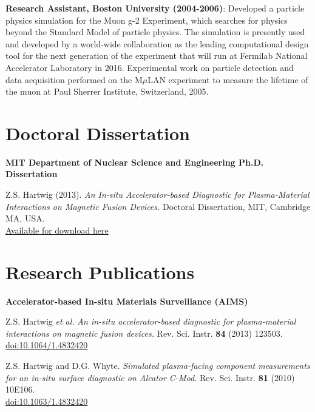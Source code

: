 \documentclass[10pt]{article}
\begin{document}
\begin{innerlist}
\item \textbf{Research Assistant, Boston University (2004-2006)}:
  Developed a particle physics simulation for the Muon g-2 Experiment,
  which searches for physics beyond the Standard Model of particle
  physics. The simulation is presently used and developed by a
  world-wide collaboration as the leading computational design tool
  for the next generation of the experiment that will run at Fermilab
  National Accelerator Laboratory in 2016. Experimental work on
  particle detection and data acquisition performed on the M$\mu$LAN
  experiment to measure the lifetime of the muon at Paul Sherrer
  Institute, Switzerland, 2005.
\end{innerlist}

\newpage
{}

\section{Doctoral Dissertation}
\textbf{MIT Department of Nuclear Science and Engineering Ph.D. Dissertation}
\begin{innerlist}
\item Z.S. Hartwig (2013). \textit{An In-situ Accelerator-based Diagnostic
  for Plasma-Material Interactions on Magnetic Fusion Devices.}
Doctoral Dissertation, MIT, Cambridge MA,
USA.\\ \href{http://www.psfc.mit.edu/library1/catalog/restricted/rr_reports/13rr012/13rr012_full.pdf}{Available
  for download here}
\end{innerlist}

\section{Research Publications}
\textbf{Accelerator-based In-situ Materials Surveillance (AIMS)}
\begin{innerlist}
\item Z.S. Hartwig \textit{et al.} \textit{An in-situ
  accelerator-based diagnostic for plasma-material interactions on
  magnetic fusion devices.} Rev. Sci. Instr. \textbf{84} (2013)
  123503.\\ 
  \href{http://dx.doi.org/10.1063/1.4832420}{doi:10.1064/1.4832420}
  \vspace{0.2cm}

\item Z.S. Hartwig and D.G. Whyte. \textit{Simulated plasma-facing
  component measurements for an in-situ surface diagnostic on Alcator
  C-Mod.} Rev. Sci. Instr. \textbf{81} (2010)
  10E106.\\ \href{http://dx.doi.org/10.1063/1.3478634}{doi:10.1063/1.4832420}
\end{innerlist}
\end{document}
